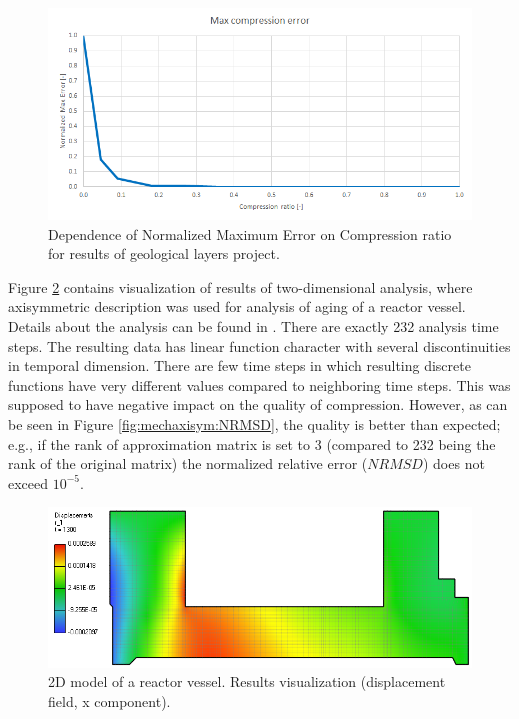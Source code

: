\begin{figure}[H]
\centering
\includegraphics[width=\textwidth]{figures/appendix-SVD/chotkova_MaxError}
\decoRule
\caption{Dependence of Normalized Maximum Error on Compression ratio for results of geological layers project.}
\label{fig:chotkova:MaxError}
\end{figure}

Figure \ref{fig:mechaxisym:mesh} contains visualization of results of two-dimensional analysis, where axisymmetric description was used for analysis of aging of a reactor vessel. Details about the analysis can be found in \cite{Kruis2005}. There are exactly 232 analysis time steps. The resulting data has linear function character with several discontinuities in temporal dimension. There are few time steps in which resulting discrete functions have very different values compared to neighboring time steps. This was supposed to have negative impact on the quality of compression. However, as can be seen in Figure \ref{fig:mechaxisym:NRMSD}, the quality is better than expected; e.g., if the rank of approximation matrix is set to 3 (compared to 232 being the rank of the original matrix) the normalized relative error ($\mathit{NRMSD}$) does not exceed $10^{-5}$.

\begin{figure}[H]
\centering
\includegraphics[width=\textwidth]{figures/appendix-SVD/mechaxisym_screenshot}
\decoRule
\caption{2D model of a reactor vessel. Results visualization (displacement field, x component).}
\label{fig:mechaxisym:mesh}
\end{figure}

